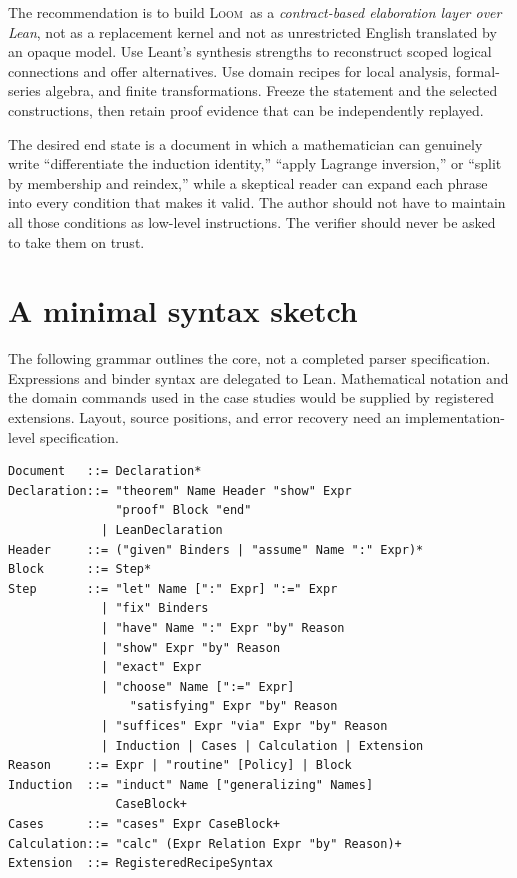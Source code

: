 \documentclass[11pt,letterpaper]{article}
\newcommand{\Loom}{\textsc{Loom}}
\theoremstyle{remark}
\begin{document}
The recommendation is to build \Loom\ as a \emph{contract-based elaboration layer over Lean}, not as a replacement kernel and not as unrestricted English translated by an opaque model. Use Leant's synthesis strengths to reconstruct scoped logical connections and offer alternatives. Use domain recipes for local analysis, formal-series algebra, and finite transformations. Freeze the statement and the selected constructions, then retain proof evidence that can be independently replayed.

The desired end state is a document in which a mathematician can genuinely write ``differentiate the induction identity,'' ``apply Lagrange inversion,'' or ``split by membership and reindex,'' while a skeptical reader can expand each phrase into every condition that makes it valid. The author should not have to maintain all those conditions as low-level instructions. The verifier should never be asked to take them on trust.

\appendix
\clearpage
\section{A minimal syntax sketch}
\label{app:grammar}

The following grammar outlines the core, not a completed parser specification. Expressions and binder syntax are delegated to Lean. Mathematical notation and the domain commands used in the case studies would be supplied by registered extensions. Layout, source positions, and error recovery need an implementation-level specification.

\par\noindent\begin{minipage}{\linewidth}
\begin{lstlisting}[caption={Indicative grammar for the proposed typed core.}]
Document   ::= Declaration*
Declaration::= "theorem" Name Header "show" Expr
               "proof" Block "end"
             | LeanDeclaration
Header     ::= ("given" Binders | "assume" Name ":" Expr)*
Block      ::= Step*
Step       ::= "let" Name [":" Expr] ":=" Expr
             | "fix" Binders
             | "have" Name ":" Expr "by" Reason
             | "show" Expr "by" Reason
             | "exact" Expr
             | "choose" Name [":=" Expr]
                 "satisfying" Expr "by" Reason
             | "suffices" Expr "via" Expr "by" Reason
             | Induction | Cases | Calculation | Extension
Reason     ::= Expr | "routine" [Policy] | Block
Induction  ::= "induct" Name ["generalizing" Names]
               CaseBlock+
Cases      ::= "cases" Expr CaseBlock+
Calculation::= "calc" (Expr Relation Expr "by" Reason)+
Extension  ::= RegisteredRecipeSyntax
\end{lstlisting}
\end{minipage}\par
\end{document}
